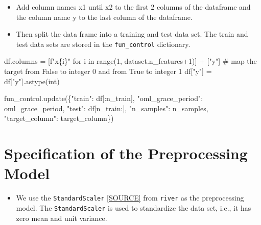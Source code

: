 \documentclass[
  letterpaper,
  DIV=11,
  numbers=noendperiod]{scrreprt}
\newenvironment{Shaded}{\begin{snugshade}}{\end{snugshade}}
\newcommand{\BuiltInTok}[1]{\textcolor[rgb]{0.00,0.23,0.31}{#1}}
\newcommand{\CommentTok}[1]{\textcolor[rgb]{0.37,0.37,0.37}{#1}}
\newcommand{\ControlFlowTok}[1]{\textcolor[rgb]{0.00,0.23,0.31}{#1}}
\newcommand{\DecValTok}[1]{\textcolor[rgb]{0.68,0.00,0.00}{#1}}
\newcommand{\KeywordTok}[1]{\textcolor[rgb]{0.00,0.23,0.31}{#1}}
\newcommand{\NormalTok}[1]{\textcolor[rgb]{0.00,0.23,0.31}{#1}}
\newcommand{\OperatorTok}[1]{\textcolor[rgb]{0.37,0.37,0.37}{#1}}
\newcommand{\SpecialCharTok}[1]{\textcolor[rgb]{0.37,0.37,0.37}{#1}}
\newcommand{\SpecialStringTok}[1]{\textcolor[rgb]{0.13,0.47,0.30}{#1}}
\newcommand{\StringTok}[1]{\textcolor[rgb]{0.13,0.47,0.30}{#1}}
\providecommand{\tightlist}{%
  \setlength{\itemsep}{0pt}\setlength{\parskip}{0pt}}\usepackage{longtable,booktabs,array}
\begin{document}
\begin{itemize}
\tightlist
\item
  Add column names x1 until x2 to the first 2 columns of the dataframe
  and the column name y to the last column of the dataframe.
\item
  Then split the data frame into a training and test data set. The train
  and test data sets are stored in the \texttt{fun\_control} dictionary.
\end{itemize}

\begin{Shaded}
\begin{Highlighting}[]
\NormalTok{df.columns }\OperatorTok{=}\NormalTok{ [}\SpecialStringTok{f"x}\SpecialCharTok{\{}\NormalTok{i}\SpecialCharTok{\}}\SpecialStringTok{"} \ControlFlowTok{for}\NormalTok{ i }\KeywordTok{in} \BuiltInTok{range}\NormalTok{(}\DecValTok{1}\NormalTok{, dataset.n\_features}\OperatorTok{+}\DecValTok{1}\NormalTok{)] }\OperatorTok{+}\NormalTok{ [}\StringTok{"y"}\NormalTok{]}
\CommentTok{\# map the target from False to integer 0 and from True to integer 1}
\NormalTok{df[}\StringTok{"y"}\NormalTok{] }\OperatorTok{=}\NormalTok{ df[}\StringTok{"y"}\NormalTok{].astype(}\BuiltInTok{int}\NormalTok{)}

\NormalTok{fun\_control.update(\{}\StringTok{"train"}\NormalTok{:  df[:n\_train],}
                    \StringTok{"oml\_grace\_period"}\NormalTok{: oml\_grace\_period,}
                    \StringTok{"test"}\NormalTok{:  df[n\_train:],}
                    \StringTok{"n\_samples"}\NormalTok{: n\_samples,}
                    \StringTok{"target\_column"}\NormalTok{: target\_column\})}
\end{Highlighting}
\end{Shaded}

\hypertarget{specification-of-the-preprocessing-model-2}{%
\section{Specification of the Preprocessing
Model}\label{specification-of-the-preprocessing-model-2}}

\begin{itemize}
\tightlist
\item
  We use the \texttt{StandardScaler}
  \href{https://riverml.xyz/dev/api/preprocessing/StandardScaler/}{{[}SOURCE{]}}
  from \texttt{river} as the preprocessing model. The
  \texttt{StandardScaler} is used to standardize the data set, i.e., it
  has zero mean and unit variance.
\end{itemize}
\end{document}
